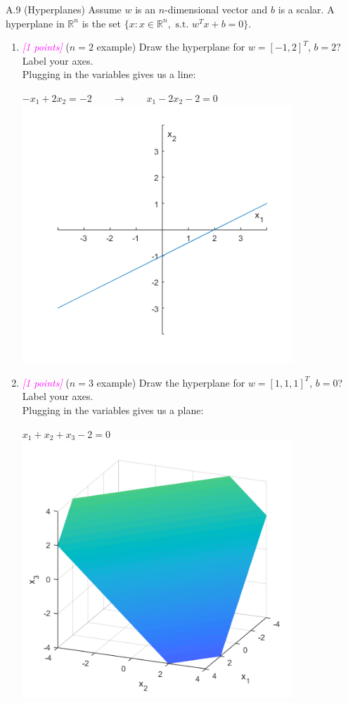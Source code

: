 \documentclass{article}
\newcommand{\field}[1]{\mathbb{#1}}
\newcommand{\1}{\mathbf{1}}
\newcommand{\R}{\field{R}} %
\newcommand{\points}[1]{\small\textcolor{magenta}{\emph{[#1 points]}} \normalsize}
\begin{document}
A.9 (Hyperplanes) Assume $w$ is an $n$-dimensional vector and $b$ is a scalar. A hyperplane in $\R^n$ is the set $\{x : x\in \R^n,\text{ s.t. } w^T x + b = 0\}$.
\begin{enumerate}
	\item \points{1} ($n=2$ example) Draw the hyperplane for $w=[-1,2]^T$, $b=2$? Label your axes.\\
	Plugging in the variables gives us a line:
	\begin{center}
		$-x_1+2x_2=-2 \qquad \rightarrow \qquad x_1-2x_2-2=0$\\
		\includegraphics[width=4in]{A9a.png}
	\end{center}
	\item \points{1} ($n=3$ example) Draw the hyperplane for $w=[1,1,1]^T$, $b=0$? Label your axes.\\
	Plugging in the variables gives us a plane:
	\begin{center}
		$x_1+x_2+x_3-2=0$\\
		\includegraphics[width=4in]{A9b.png}

\end{center}
\end{enumerate}
\end{document}
